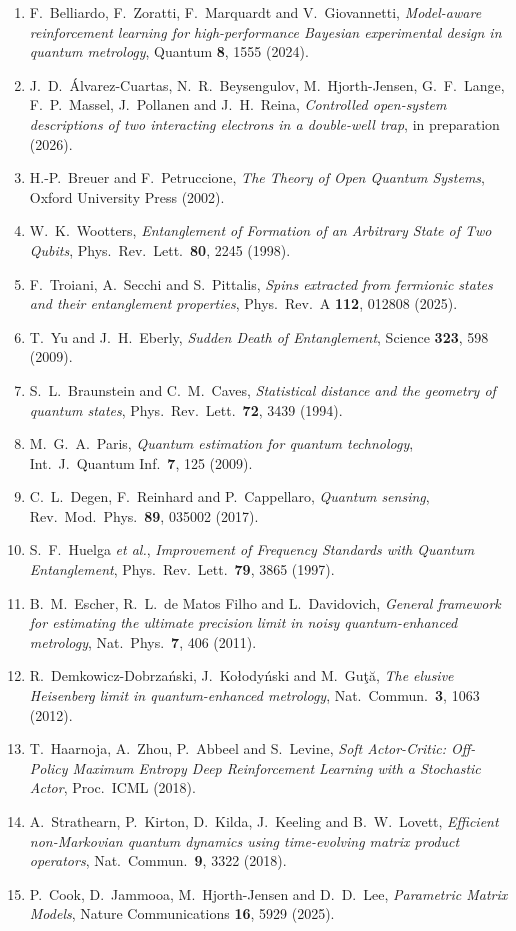\documentclass[12pt,a4paper]{article}
\begin{document}
\begin{enumerate}
    \item F.~Belliardo, F.~Zoratti, F.~Marquardt and V.~Giovannetti, \textit{Model-aware reinforcement learning for high-performance Bayesian experimental design in quantum metrology}, Quantum \textbf{8}, 1555 (2024).
    \item J.~D.~\'Alvarez-Cuartas, N.~R.~Beysengulov, M.~Hjorth-Jensen, G.~F.~Lange, F.~P.~Massel, J.~Pollanen and J.~H.~Reina, \textit{Controlled open-system descriptions of two interacting electrons in a double-well trap}, in preparation (2026).
    \item H.-P.~Breuer and F.~Petruccione, \textit{The Theory of Open Quantum Systems}, Oxford University Press (2002).
    \item W.~K.~Wootters, \textit{Entanglement of Formation of an Arbitrary State of Two Qubits}, Phys.\ Rev.\ Lett.\ \textbf{80}, 2245 (1998).
    \item F.~Troiani, A.~Secchi and S.~Pittalis, \textit{Spins extracted from fermionic states and their entanglement properties}, Phys.\ Rev.\ A \textbf{112}, 012808 (2025).
    \item T.~Yu and J.~H.~Eberly, \textit{Sudden Death of Entanglement}, Science \textbf{323}, 598 (2009).
    \item S.~L.~Braunstein and C.~M.~Caves, \textit{Statistical distance and the geometry of quantum states}, Phys.\ Rev.\ Lett.\ \textbf{72}, 3439 (1994).
    \item M.~G.~A.~Paris, \textit{Quantum estimation for quantum technology}, Int.\ J.\ Quantum Inf.\ \textbf{7}, 125 (2009).
    \item C.~L.~Degen, F.~Reinhard and P.~Cappellaro, \textit{Quantum sensing}, Rev.\ Mod.\ Phys.\ \textbf{89}, 035002 (2017).
    \item S.~F.~Huelga \textit{et al.}, \textit{Improvement of Frequency Standards with Quantum Entanglement}, Phys.\ Rev.\ Lett.\ \textbf{79}, 3865 (1997).
    \item B.~M.~Escher, R.~L.~de Matos Filho and L.~Davidovich, \textit{General framework for estimating the ultimate precision limit in noisy quantum-enhanced metrology}, Nat.\ Phys.\ \textbf{7}, 406 (2011).
    \item R.~Demkowicz-Dobrza\'nski, J.~Ko{\l}ody\'nski and M.~Gu\c{t}\u{a}, \textit{The elusive Heisenberg limit in quantum-enhanced metrology}, Nat.\ Commun.\ \textbf{3}, 1063 (2012).
    \item T.~Haarnoja, A.~Zhou, P.~Abbeel and S.~Levine, \textit{Soft Actor-Critic: Off-Policy Maximum Entropy Deep Reinforcement Learning with a Stochastic Actor}, Proc.\ ICML (2018).
    \item A.~Strathearn, P.~Kirton, D.~Kilda, J.~Keeling and B.~W.~Lovett, \textit{Efficient non-Markovian quantum dynamics using time-evolving matrix product operators}, Nat.\ Commun.\ \textbf{9}, 3322 (2018).
    \item P.~Cook, D.~Jammooa, M.~Hjorth-Jensen and D.~D.~Lee, \textit{Parametric Matrix Models}, Nature Communications \textbf{16}, 5929 (2025).
\end{enumerate}
\end{document}
